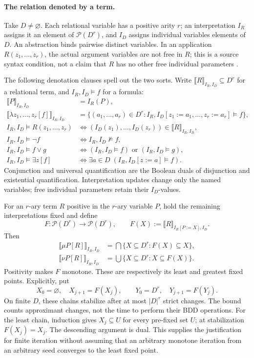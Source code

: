 \paragraph{The relation denoted by a term.}
Take \(D\ne\varnothing\). Each relational variable has a positive arity \(r\);
an interpretation \(I_R\) assigns it an element of \(\mathcal P(D^r)\),
and \(I_D\) assigns individual variables elements of \(D\).
An abstraction binds pairwise distinct variables. In an application
\(R(z_1,\ldots,z_r)\), the actual argument variables are not free in \(R\);
this is a source syntax condition, not a claim that \(R\) has no other free
individual parameters \cite[\S3]{BurchEtAl1992}.

The following denotation clauses spell out the two sorts. Write
\(\llbracket R\rrbracket_{I_R,I_D}\subseteq D^r\) for a relational term,
and \(I_R,I_D\models f\) for a formula:
\[
\begin{aligned}
 \llbracket P\rrbracket_{I_R,I_D}&=I_R(P),\\
 \llbracket\lambda z_1,\ldots,z_r[f]\rrbracket_{I_R,I_D}
 &=\{(a_1,\ldots,a_r)\in D^r:
       I_R,I_D[z_1:=a_1,\ldots,z_r:=a_r]\models f\},\\
 I_R,I_D\models R(z_1,\ldots,z_r)
 &\iff (I_D(z_1),\ldots,I_D(z_r))
             \in\llbracket R\rrbracket_{I_R,I_D},\\
 I_R,I_D\models\neg f&\iff I_R,I_D\not\models f,\\
 I_R,I_D\models f\lor g
 &\iff (I_R,I_D\models f)\text{ or }(I_R,I_D\models g),\\
 I_R,I_D\models\exists z[f]
 &\iff\exists a\in D\;(I_R,I_D[z:=a]\models f).
\end{aligned}
\]
Conjunction and universal quantification are the Boolean duals of disjunction
and existential quantification. Interpretation updates change only the named
variables; free individual parameters retain their \(I_D\)-values.

For an \(r\)-ary term \(R\) positive in the \(r\)-ary variable \(P\), hold
the remaining interpretations fixed and define
\[
 F:\mathcal P(D^r)\to\mathcal P(D^r),\qquad
 F(X):=\llbracket R\rrbracket_{I_R[P:=X],I_D}.
\]
Then
\[
\begin{aligned}
 \llbracket\mu P[R]\rrbracket_{I_R,I_D}
   &=\bigcap\{X\subseteq D^r:F(X)\subseteq X\},\\
 \llbracket\nu P[R]\rrbracket_{I_R,I_D}
   &=\bigcup\{X\subseteq D^r:X\subseteq F(X)\}.
\end{aligned}
\]
Positivity makes \(F\) monotone. These are respectively its least and greatest
fixed points. Explicitly, put
\[
 X_0=\varnothing,\quad X_{j+1}=F(X_j),\qquad
 Y_0=D^r,\quad Y_{j+1}=F(Y_j).
\]
On finite \(D\), these chains stabilize after at most \(|D|^r\) strict changes.
The bound counts approximant changes, not the time to perform their BDD
operations.
For the least chain, induction gives \(X_j\subseteq U\) for every
pre-fixed set \(U\); at stabilization \(F(X_j)=X_j\). The descending argument
is dual. This supplies the justification for finite iteration without
assuming that an arbitrary monotone iteration from an arbitrary seed converges
to the least fixed point.

